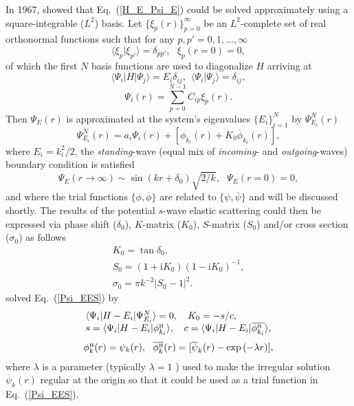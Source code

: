\documentclass[aip
, pra
, showpacs
, aps
, twocolumn
, groupedaddress
, floatfix
]{revtex4}
\newcommand{\beq}{\begin{equation}}
\newcommand{\eeq}{\end{equation}}
\newcommand{\barr}{\begin{array}}
\newcommand{\earr}{\end{array}}
\newcommand{\phiH}{\phi^{\mbox{\tiny{H}}}}
\begin{document}
In 1967, \citet{Harris67} showed that Eq.~(\ref{H_E_Psi_E}) could be solved
approximately using a square-integrable ($L^2$) basis.
Let $\{\xi_p(r)\}_{p=0}^\infty$ be an $L^2$-complete set of real orthonormal functions
such that for any $p,p'=0,1,...,\infty$
\beq
\langle \xi_p | \xi_{p'} \rangle=\delta_{pp'}, \ \ \ \xi_p(r=0)=0,
\eeq
of which the first $N$ basis functions are used to diagonalize $H$ arriving at
\beq
\langle \Psi_i |H| \Psi_j \rangle = E_i \delta_{ij} , \ \ \langle \Psi_i | \Psi_j \rangle=\delta_{ij},
\eeq
\beq
\Psi_i(r) = \sum_{p=0}^{N-1} C_{ip} \xi_p(r).
\eeq
Then $\Psi_E(r)$ is approximated at the system's eigenvalues $\{E_i\}_{i=1}^{N}$ by $\Psi^N_{E_i}(r)$
\cite{Harris67}
\beq
\Psi^N_{E_i}(r) = a_i \Psi_i(r)  + [\phi_{k_i}(r)  + K_{0} \overline{\phi}_{k_i}(r)],
\label{Psi_EES} \eeq
where $E_i=k_i^2/2$, the {\em standing}-wave (equal mix of {\em incoming}- and {\em outgoing}-waves) boundary condition is satisfied
\beq
\Psi_E(r \rightarrow \infty) \sim  \sin(kr+\delta_0) \sqrt{2/k}, \ \ \ \Psi_E(r= 0)=0,
\eeq
and where the trial functions $\{\phi,\overline{\phi}\}$ are related to $\{\psi,\overline{\psi}\}$ and will be discussed shortly.
The results of the potential $s$-wave elastic scattering could then be expressed via
phase shift ($\delta_0$), $K$-matrix ($K_0$), $S$-matrix ($S_{0}$) and/or cross section ($\sigma_{0}$)
as follows
\beq \barr{l}
K_{0} = \tan{\delta_0},\\
S_{0}=(1+\mbox{i}K_0)(1-\mbox{i}K_0)^{-1}, \\
\sigma_{0}=\pi k^{-2} |S_{0}-1|^2.
\earr \eeq
\citet{Harris67} solved Eq.~(\ref{Psi_EES}) by
\beq \barr{l}
\langle\Psi_i|H-E_i|\Psi^N_{E_i}\rangle=0,\ \ \
K_{0} = - s / c, \\
s = \langle\Psi_i|H-E_i|  \phiH_{k_i} \rangle, \ \ \
c = \langle\Psi_i|H-E_i|  \overline{\phiH_{k_i}} \rangle,
\earr \label{K_0_Harris} \eeq
\beq \barr{l}
\phiH_k(r) =  \psi_k(r),\ \ 
\overline{\phiH_k}(r) =  [\overline{\psi}_k(r) - \exp{(-\lambda r)}],
\earr \label{def_phi_H} \eeq
where $\lambda$ is a parameter (typically $\lambda=1$ \cite{Nesbet68}) used to make the irregular solution $\overline{\psi}_k(r)$ regular
at the origin so that it could be used as a trial function in Eq.~(\ref{Psi_EES}).
\end{document}
